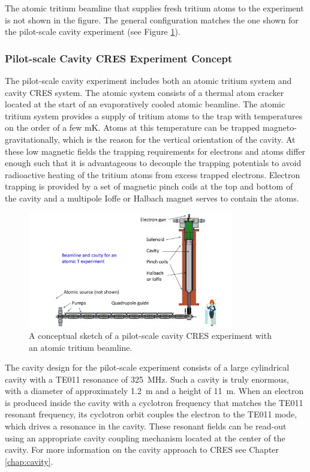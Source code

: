 The atomic tritium beamline that supplies fresh tritium atoms to the experiment is not shown in the figure. The general configuration matches the one shown for the pilot-scale cavity experiment (see Figure \ref{fig:chap3-cavity-pilot-scale}).

\subsubsection*{Pilot-scale Cavity CRES Experiment Concept}

The pilot-scale cavity experiment includes both an atomic tritium system and cavity CRES system. The atomic system consists of a thermal atom cracker located at the start of an evaporatively cooled atomic beamline. The atomic tritium system provides a supply of tritium atoms to the trap with temperatures on the order of a few mK. Atoms at this temperature can be trapped magneto-gravitationally, which is the reason for the vertical orientation of the cavity. At these low magnetic fields the trapping requirements for electrons and atoms differ enough such that it is advantageous to decouple the trapping potentials to avoid radioactive heating of the tritium atoms from excess trapped electrons. Electron trapping is provided by a set of magnetic pinch coils at the top and bottom of the cavity and a multipole Ioffe or Halbach magnet serves to contain the atoms.

\begin{figure}[htbp]
    \centering
    \includegraphics*[width=0.8\textwidth]{figs/Chapter-3/CavityAndBeamAndPerson2.pdf}
    \caption{\label{fig:chap3-cavity-pilot-scale} A conceptual sketch of a pilot-scale cavity CRES experiment with an atomic tritium beamline.}
\end{figure}

The cavity design for the pilot-scale experiment consists of a large cylindrical cavity with a TE011 resonance of 325~MHz. Such a cavity is truly enormous, with a diameter of approximately 1.2~m and a height of 11~m. When an electron is produced inside the cavity with a cyclotron frequency that matches the TE011 resonant frequency, its cyclotron orbit couples the electron to the TE011 mode, which drives a resonance in the cavity. These resonant fields can be read-out using an appropriate cavity coupling mechanism located at the center of the cavity. For more information on the cavity approach to CRES see Chapter \ref{chap:cavity}.

